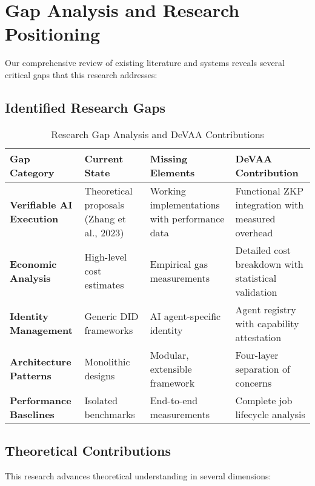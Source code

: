 \section{Gap Analysis and Research Positioning}

Our comprehensive review of existing literature and systems reveals several critical gaps that this research addresses:

\subsection{Identified Research Gaps}

\begin{table}[h]
\centering
\caption{Research Gap Analysis and DeVAA Contributions}
\label{tab:gap-analysis}
\begin{tabular}{p{4cm}p{4cm}p{4cm}p{3cm}}
\toprule
\textbf{Gap Category} & \textbf{Current State} & \textbf{Missing Elements} & \textbf{DeVAA Contribution} \\
\midrule
\textbf{Verifiable AI Execution} & Theoretical proposals (Zhang et al., 2023) & Working implementations with performance data & Functional ZKP integration with measured overhead \\
\textbf{Economic Analysis} & High-level cost estimates & Empirical gas measurements & Detailed cost breakdown with statistical validation \\
\textbf{Identity Management} & Generic DID frameworks & AI agent-specific identity & Agent registry with capability attestation \\
\textbf{Architecture Patterns} & Monolithic designs & Modular, extensible framework & Four-layer separation of concerns \\
\textbf{Performance Baselines} & Isolated benchmarks & End-to-end measurements & Complete job lifecycle analysis \\
\bottomrule
\end{tabular}
\end{table}

\subsection{Theoretical Contributions}

This research advances theoretical understanding in several dimensions:

